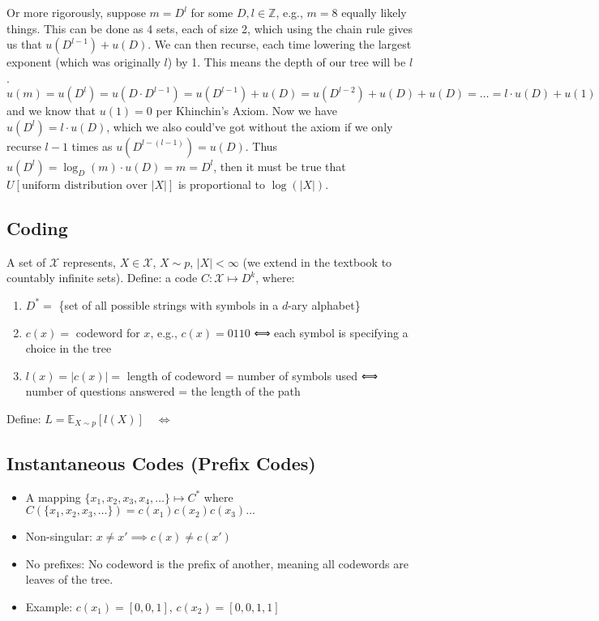 Or more rigorously, suppose \( m= D^l \) for some \( D, l \in \mathbb{Z} \), e.g., \( m=8 \) equally likely things. This can be done as 4 sets, each of size 2, which using the chain rule gives us that \( u(D^{l-1}) + u(D) \). 
We can then recurse, each time lowering the largest exponent (which was originally \( l \)) by 1. This means the depth of our tree will be \( l \).
\[ u(m) = u(D^l) = u(D \cdot D^{l-1}) = u(D^{l-1}) + u(D) = u(D^{l-2}) + u(D) + u(D) = \ldots = l \cdot u(D) + u(1) \]
and we know that \( u(1)=0 \) per Khinchin’s Axiom.
Now we have \( u(D^l) = l \cdot u(D) \), which we also could’ve got without the axiom if we only recurse \( l-1 \) times as \( u(D^{l-(l-1)})=u(D) \). Thus \( u(D^l) = \log_D(m) \cdot u(D) = m=D^l \),
then it must be true that \( U[\text{uniform distribution over } |X|] \) is proportional to \( \log(|X|) \).

\subsection{Coding}

A set of \( \mathcal{X} \) represents, \( X \in \mathcal{X} \), \( X \sim p \), \( |X| < \infty \) (we extend in the textbook to countably infinite sets).
Define: a code \( C: \mathcal{X} \mapsto D^k \), where:
\begin{enumerate}
    \item \( D^* = \) \{set of all possible strings with symbols in a \( d \)-ary alphabet\}
    \item \( c(x) = \) codeword for \( x \), e.g., \( c(x) = 0110 \) ⟺ each symbol is specifying a choice in the tree
    \item \( l(x) = |c(x)| = \) length of codeword = number of symbols used ⟺ number of questions answered = the length of the path
\end{enumerate}
Define: \( L = \mathbb{E}_{X \sim p}[l(X)] \quad\iff\) 

\subsection{Instantaneous Codes (Prefix Codes)}

\begin{itemize}
    \item A mapping \( \{x_1, x_2, x_3, x_4, \ldots\} \mapsto C^* \) where \( C(\{x_1, x_2, x_3, \ldots\}) = c(x_1) c(x_2) c(x_3) \ldots \)
    \item Non-singular: \( x \neq x' \implies c(x) \neq c(x') \)
    \item No prefixes: No codeword is the prefix of another, meaning all codewords are leaves of the tree.
    \item Example: \( c(x_1) = [0, 0, 1] \), \( c(x_2) = [0, 0, 1, 1] \)
\end{itemize}

